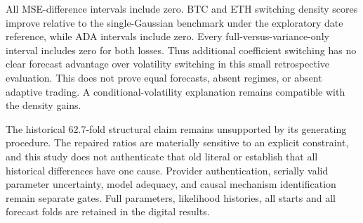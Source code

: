 All MSE-difference intervals include zero. BTC and ETH switching density scores improve relative to the single-Gaussian benchmark under the exploratory date reference, while ADA intervals include zero. Every full-versus-variance-only interval includes zero for both losses. Thus additional coefficient switching has no clear forecast advantage over volatility switching in this small retrospective evaluation. This does not prove equal forecasts, absent regimes, or absent adaptive trading. A conditional-volatility explanation remains compatible with the density gains.

The historical 62.7-fold structural claim remains unsupported by its generating procedure. The repaired ratios are materially sensitive to an explicit constraint, and this study does not authenticate that old literal or establish that all historical differences have one cause. Provider authentication, serially valid parameter uncertainty, model adequacy, and causal mechanism identification remain separate gates. Full parameters, likelihood histories, all starts and all forecast folds are retained in the digital results.
